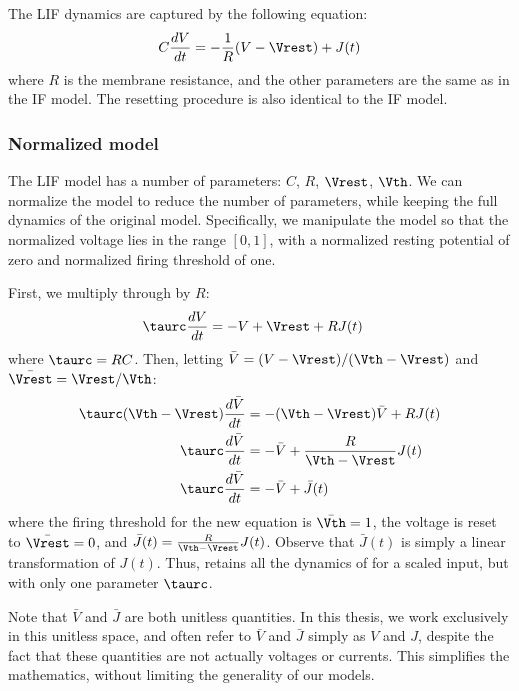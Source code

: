 The LIF dynamics are captured by the following equation:
\begin{align}
  C \diff{V}{t} = -\frac{1}{R}(V - \Vrest) + J(t)
  \eqnlabel{lifdifffull}
\end{align}
where $R$ is the membrane resistance,
and the other parameters are the same as in the IF model.
The resetting procedure is also identical to the IF model.


\subsubsection{Normalized model}

The LIF model has a number of parameters:
$C$, $R$, $\Vrest$, $\Vth$.
We can normalize the model to reduce the number of parameters,
while keeping the full dynamics of the original model.
Specifically, we manipulate the model
so that the normalized voltage lies in the range $[0, 1]$,
with a normalized resting potential of zero
and normalized firing threshold of one.

First, we multiply  through by $R$:
\begin{align}
  \taurc \diff{V}{t} &= -V + \Vrest + R J(t)
\end{align}
where $\taurc = RC$.
Then, letting $\bar V = (V - \Vrest) / (\Vth - \Vrest)$
and $\bar \Vrest = \Vrest / \Vth$:
\begin{align}
  \taurc (\Vth - \Vrest) \diff{\bar V}{t} &= -(\Vth - \Vrest) \bar V + R J(t) \nonumber\\
  \taurc \diff{\bar V}{t} &= -\bar V + \frac{R}{\Vth - \Vrest} J(t) \nonumber\\
  \taurc \diff{\bar V}{t} &= -\bar V + \bar J(t)
  \eqnlabel{lifdiff}
\end{align}
where the firing threshold for the new equation is $\bar \Vth = 1$,
the voltage is reset to $\bar \Vrest = 0$,
and $\bar J(t) = \frac{R}{\Vth - \Vrest} J(t)$.
Observe that $\bar J(t)$ is simply a linear transformation of $J(t)$.
Thus,  retains all the dynamics of  for a scaled input,
but with only one parameter $\taurc$.

Note that $\bar V$ and $\bar J$ are both unitless quantities.
In this thesis, we work exclusively in this unitless space,
and often refer to $\bar V$ and $\bar J$ simply as $V$ and $J$,
despite the fact that these quantities are not actually voltages or currents.
This simplifies the mathematics,
without limiting the generality of our models.


